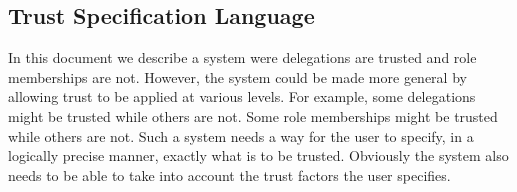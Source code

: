 \documentclass{article}
\begin{document}
\subsection{Trust Specification Language}

In this document we describe a system were delegations are trusted and role memberships are not.
However, the system could be made more general by allowing trust to be applied at various
levels. For example, some delegations might be trusted while others are not. Some role
memberships might be trusted while others are not. Such a system needs a way for the user to
specify, in a logically precise manner, exactly what is to be trusted. Obviously the system also
needs to be able to take into account the trust factors the user specifies.



\end{document}
